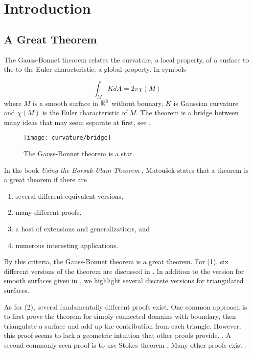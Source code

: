 \section{Introduction}
\label{sec:intro}

\subsection{A Great Theorem}
The Gauss-Bonnet theorem relates the curvature, a local property, of a surface to the 
to the Euler characteristic, a global property. In symbols 

\begin{equation}\label{eqn:g-b-noboundary}
		\int_MK dA =2\pi \chi(M)
\end{equation}
where $M$ is a smooth surface in $\mathbb{R}^3$ without bounary, $K$ is Gaussian curvature
and $\chi(M)$ is the Euler characteristic of $M$.
The theorem is a bridge between many ideas that may
seem separate at first, see . 




\begin{figure}[htb]
\centering
\texttt{[image: curvature/bridge]}
\caption{The Gauss-Bonnet theorem is a star.}
\label{fig:bridge}
\end{figure}

In the book \emph{Using the Borsuk-Ulam Theorem}
\cite{jm08},
Matou\v{s}ek states that a theorem is a great theorem if there are
\begin{enumerate}[(1)]
\item several different equivalent versions,
\item many different proofs,
\item a host of extensions and generalizations, and
\item numerous interesting applications.
\end{enumerate}

By this criteria, the Gauss-Bonnet theorem is a great theorem.
For (1), six different versions of the theorem are discussed
in \cite{wu_historical_2008}. 
In addition to the version for smooth surfaces given in ,
we highlight
 several discrete versions for triangulated surfaces. 
  




 
 
As for (2), several fundamentally different proofs exist.  
One common approach is to first prove the theorem for simply connected domains
with boundary, then triangulate a surface and add up the contribution from each triangle.
However, this proof seems to lack a geometric intuition that other proofs provide. \cite{wu_historical_2008},
A second commonly seen proof is to use Stokes theorem  \cite{doc76,pressley_elementary_2010}.
Many other proofs exist \cite{guillemin_differential_2010,levi-bicycle,grinfeld_introduction_2013}.



